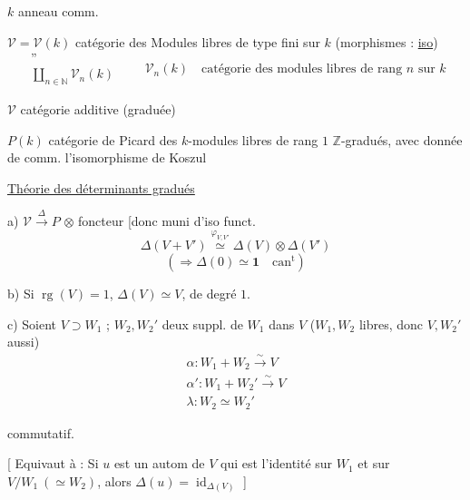 $k$ anneau comm.

$\mathcal V=\mathcal V(k)$ catégorie des Modules libres de type fini sur $k$ (morphismes : \uline{iso})
\[
\begin{array}{c}
\text{''}\\
\displaystyle\coprod_{n\in\mathbb{N}}\mathcal V_n(k)
\end{array}
\qquad\mathcal V_n(k)\quad\text{catégorie des modules libres de rang }n\text{ sur }k
\]

$\mathcal V$ catégorie additive (graduée)


 $P(k)$ catégorie de Picard des $k$-modules libres de rang $1$ $\mathbb{Z}$-gradués, avec donnée de comm. l'isomorphisme de Koszul

\uline{Théorie des  déterminants gradués}

a) $\mathcal V\xrightarrow{\Delta}P$ $\otimes$ foncteur [donc muni d'iso funct.
\[
\Delta(V+V')\overset{\varphi_{V,V'}}{\simeq}\Delta(V)\otimes\Delta(V')
\]
\[
(\Rightarrow\Delta(0)\simeq\mathbf1\quad\text{can}^{\mathrm t})
\]

b) Si $\operatorname{rg}(V)=1$, $\Delta(V)\simeq V$, de degré $1$.

c) Soient $V\supset W_1$ ; $W_2,W_2'$ deux suppl. de $W_1$ dans $V$ ($W_1,W_2$ libres, donc $V,W_2'$ aussi)
\[
\begin{array}{l}
\alpha:W_1+W_2\xrightarrow{\sim}V\\
\alpha':W_1+W_2'\xrightarrow{\sim}V\\
\lambda:W_2\simeq W_2'
\end{array}
\]

commutatif.

[ Equivaut à : Si $u$ est un autom de $V$ qui est l'identité sur $W_1$ et sur $V/W_1\ (\simeq W_2)$, alors $\Delta(u)=\operatorname{id}_{\Delta(V)}$ ]

